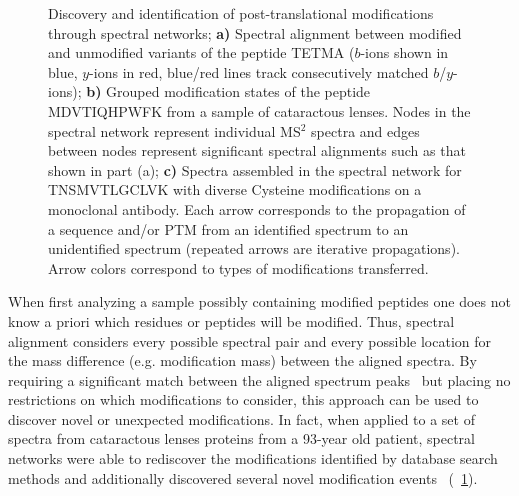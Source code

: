 \documentclass[8.5pt,twoside,twocolumn]{article}
\begin{document}
\begin{figure}[!htb]
\centering
{}
\caption{Discovery and identification of post-translational modifications through spectral networks; \textbf{a)} Spectral alignment between modified and unmodified variants of the peptide TETMA ($b$-ions shown in blue, $y$-ions in red, blue/red lines track consecutively matched $b$/$y$-ions); \textbf{b)} Grouped modification states of the peptide MDVTIQHPWFK from a sample of cataractous lenses. Nodes in the spectral network represent individual MS$^2$ spectra and edges between nodes represent significant spectral alignments such as that shown in part (a); \textbf{c)} Spectra assembled in the spectral network for TNSMVTLGCLVK with diverse Cysteine modifications on a monoclonal antibody. Each arrow corresponds to the propagation of a sequence and/or PTM from an identified spectrum to an unidentified spectrum (repeated arrows are iterative propagations). Arrow colors correspond to types of modifications transferred.}
\label{figSpecNets}
\end{figure}

When first analyzing a sample possibly containing modified peptides one does not know a priori which residues or peptides will be modified. Thus, spectral alignment considers every possible spectral pair and every possible location for the mass difference (e.g. modification mass) between the aligned spectra. By requiring a significant match between the aligned spectrum peaks~\cite{bandeira07pnas} but placing no restrictions on which modifications to consider, this approach can be used to discover novel or unexpected modifications. In fact, when applied to a set of spectra from cataractous lenses proteins from a 93-year old patient, spectral networks were able to rediscover the modifications identified by database search methods and additionally discovered several novel modification events~\cite{tsur05,bandeira07pnas} (~\ref{figSpecNets}).
\end{document}
